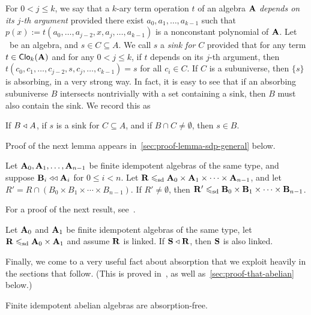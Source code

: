 For $0<j\leq k$, we say that a $k$-ary term operation $t$ of an algebra $\mathbf{A}$
\emph{depends on its $j$-th argument} provided there exist $a_0, a_1, \dots, a_{k-1}$
such that $p(x) := t(a_0, \dots, a_{j-2}, x, a_{j}, \dots, a_{k-1})$ is a
nonconstant polynomial of $\mathbf{A}$.
Let \bA\ be an algebra, and $s \in C \subseteq A$. We call $s$ a
\emph{sink for} $C$ provided that for any term 
$t \in \operatorname{\mathsf{Clo}}_k(\mathbf{A})$ and for any $0< j \leq k$, if 
$t$ depends on its $j$-th argument, then 
$t(c_0, c_1, \dots, c_{j-2}, s, c_{j}, \dots, c_{k-1})=s$
for all $c_i \in C$.  If $C$ is a subuniverse, then $\{s\}$ is absorbing, in a very strong way. In fact,
it is easy to see that if an absorbing subuniverse $B$ intersects
nontrivially with a set containing a sink, then $B$ must also contain the sink.
We record this as
\begin{lemma}
\label{lem:sink}
  If $B \mathrel{\triangleleft} A$, if $s$ is a sink for $C\subseteq A$, and 
  if $B\cap C \neq \emptyset$, then $s\in B$.
\end{lemma}

Proof of the next lemma %
appears in~\ref{sec:proof-lemma-sdp-general} below.
\begin{lemma}
\label{lem:sdp-general}
  Let $\mathbf{A}_0, \mathbf{A}_1, \dots, \mathbf{A}_{n-1}$ be finite idempotent algebras of the same type, and
  suppose $\mathbf{B}_i \mathrel{\triangleleft\triangleleft} \mathbf{A}_i$ for $0\leq i< n$.
  Let $\mathbf{R} \leqslant_{\mathrm{sd}} \mathbf{A}_0 \times \mathbf{A}_1 \times \cdots \times \mathbf{A}_{n-1}$, 
  and let $R' = R \cap (B_0 \times B_1 \times \cdots \times B_{n-1})$.  
  If $R'\neq \emptyset$, then $\mathbf{R}' \leqslant_{\mathrm{sd}} \mathbf{B}_0 \times \mathbf{B}_1 \times \cdots \times \mathbf{B}_{n-1}$.
\end{lemma}

For a proof of the next result, %
see~\cite[Prop~2.15]{MR2893395}.

\begin{lemma}
\label{lem:linked-absorber}
Let $\mathbf{A}_0$ and $\mathbf{A}_1$ be finite idempotent algebras of the same type, let
$\mathbf{R} \leqslant_{\mathrm{sd}} \mathbf{A}_0 \times \mathbf{A}_1$ and assume $\mathbf{R}$ is linked.
If $\mathbf{S} \mathrel{\triangleleft} \mathbf{R}$, then $\mathbf{S}$ is also linked.
\end{lemma}

Finally, we come to a very useful fact about absorption that we exploit heavily
in the sections that follow. 
(This is proved  %
in~\cite[Lem~4.1]{MR3374664}, as well as~\ref{sec:proof-that-abelian}
  below.)
\begin{lemma}
\label{lem:abelian-AF}
  Finite idempotent abelian algebras are absorption-free. 
\end{lemma}


